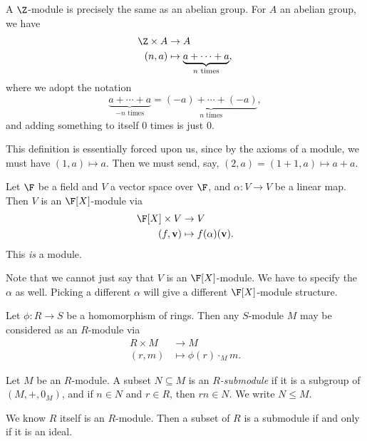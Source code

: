 \documentclass[a4paper]{article}
\begin{document}
\begin{eg}
  A $\Z$-module is precisely the same as an abelian group. For $A$ an abelian group, we have
  \begin{align*}
    \Z \times A &\to A\\
    (n, a) &\mapsto \underbrace{a + \cdots + a}_{n\text{ times}},
  \end{align*}
  where we adopt the notation
  \[
    \underbrace{a + \cdots + a}_{-n\text{ times}} = \underbrace{(-a) + \cdots + (-a)}_{n\text{ times}},
  \]
  and adding something to itself $0$ times is just $0$.

  This definition is essentially forced upon us, since by the axioms of a module, we must have $(1, a) \mapsto a$. Then we must send, say, $(2, a) = (1 + 1, a) \mapsto a + a$.
\end{eg}

\begin{eg}
  Let $\F$ be a field and $V$ a vector space over $\F$, and $\alpha: V \to V$ be a linear map. Then $V$ is an $\F[X]$-module via
  \begin{align*}
    \F[X] \times V &\to V\\
    (f, \mathbf{v}) & \mapsto f(\alpha) (\mathbf{v}).
  \end{align*}
  This \emph{is} a module.

  Note that we cannot just say that $V$ is an $\F[X]$-module. We have to specify the $\alpha$ as well. Picking a different $\alpha$ will give a different $\F[X]$-module structure.
\end{eg}

\begin{eg}
  Let $\phi: R \to S$ be a homomorphism of rings. Then any $S$-module $M$ may be considered as an $R$-module via
  \begin{align*}
    R\times M &\to M\\
    (r, m) &\mapsto \phi(r) \cdot_M m.
  \end{align*}
\end{eg}

\begin{defi}[Submodule]
  Let $M$ be an $R$-module. A subset $N \subseteq M$ is an \emph{$R$-submodule} if it is a subgroup of $(M, +, 0_M)$, and if $n \in N$ and $r \in R$, then $rn \in N$. We write $N \leq M$.
\end{defi}

\begin{eg}
  We know $R$ itself is an $R$-module. Then a subset of $R$ is a submodule if and only if it is an ideal.
\end{eg}
\end{document}
